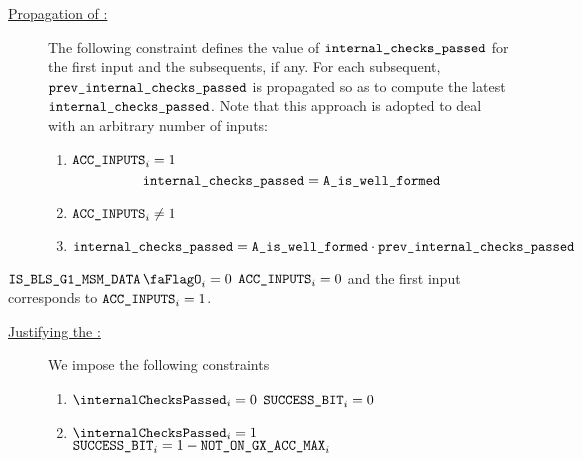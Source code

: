 \begin{description}
    \item[\underline{Propagation of \locInternalChecksPassed:}]
          The following constraint defines the value of $\texttt{internal\_checks\_passed}$ for the first input and the subsequents, if any.
          For each subsequent, $\texttt{prev\_}\texttt{internal\_checks\_passed}$ is propagated so as to compute the latest $\texttt{internal\_checks\_passed}$.
          Note that this approach is adopted to deal with an arbitrary number of inputs:
          \begin{enumerate}
              \item \If $\texttt{ACC\_INPUTS}_{i} = 1$ \Then
                    \[
                        \texttt{internal\_checks\_passed} = \texttt{A\_is\_well\_formed} 
                    \]
              \item \If $\texttt{ACC\_INPUTS}_{i} \neq 1$ \Then
                    \item $\texttt{internal\_checks\_passed} = \texttt{A\_is\_well\_formed} \cdot \texttt{prev\_}\texttt{internal\_checks\_passed}$
          \end{enumerate}
\end{description}
\saNote{} \If $\isBlsGOneMsmData_{i} = 0$ \Then $\texttt{ACC\_INPUTS}_{i} = 0$ and the first input corresponds to $\texttt{ACC\_INPUTS}_{i} = 1$.
\begin{description}
    \item[\underline{Justifying the \blsSuccessBit{}:}]
          We impose the following constraints
          \begin{enumerate}
              \item \If $\internalChecksPassed _{i}= 0$ \Then $\texttt{SUCCESS\_BIT} _{i} = 0$
              \item \If $\internalChecksPassed _{i}= 1$  \Then $\texttt{SUCCESS\_BIT}_{i} = 1 - \texttt{NOT\_ON\_GX\_ACC\_MAX} _{i}$
          \end{enumerate}
\end{description}